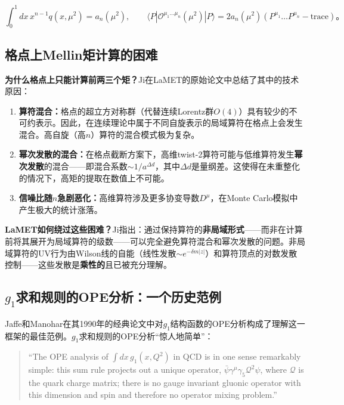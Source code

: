 \documentclass[12pt,a4paper]{ctexart}
\theoremstyle{definition}
\begin{document}
\begin{equation}
\int_0^1 dx\, x^{n-1} q(x, \mu^2) = a_n(\mu^2), \qquad \langle P|\mathcal{O}^{\mu_1\ldots\mu_n}(\mu^2)|P\rangle = 2a_n(\mu^2)(P^{\mu_1}\ldots P^{\mu_n} - \text{trace})。
\label{eq:moment_relation}
\end{equation}

\subsection{格点上Mellin矩计算的困难}

\textbf{为什么格点上只能计算前两三个矩？}Ji在LaMET的原始论文中总结了其中的技术原因\cite{Ji2013Euclidean}：

\begin{enumerate}
    \item \textbf{算符混合：}格点的超立方对称群（代替连续Lorentz群$O(4)$）具有较少的不可约表示。因此，在连续理论中属于不同自旋表示的局域算符在格点上会发生混合。高自旋（高$n$）算符的混合模式极为复杂。

    \item \textbf{幂次发散的混合：}在格点截断方案下，高维twist-2算符可能与低维算符发生\textbf{幂次发散}的混合——即混合系数$\sim 1/a^{\Delta d}$，其中$\Delta d$是量纲差。这使得在未重整化的情况下，高矩的提取在数值上不可能。

    \item \textbf{信噪比随$n$急剧恶化：}高维算符涉及更多协变导数$D^\mu$，在Monte Carlo模拟中产生极大的统计涨落。
\end{enumerate}

\textbf{LaMET如何绕过这些困难？}Ji指出\cite{Ji2013Euclidean,Ji2017More}：通过保持算符的\textbf{非局域形式}——而非在计算前将其展开为局域算符的级数——可以完全避免算符混合和幂次发散的问题。非局域算符的UV行为由Wilson线的自能（线性发散$\sim e^{-\delta m|z|}$）和算符顶点的对数发散控制——这些发散是\textbf{乘性的}且已被充分理解。

\subsection{$g_1$求和规则的OPE分析：一个历史范例}

Jaffe和Manohar在其1990年的经典论文\cite{JaffeManohar1990}中对$g_1$结构函数的OPE分析构成了理解这一框架的最佳范例。$g_1$求和规则的OPE分析``惊人地简单''\cite{JaffeManohar1990}：

\begin{quote}
``The OPE analysis of $\int dx\, g_1(x,Q^2)$ in QCD is in one sense remarkably simple: this sum rule projects out a unique operator, $\bar{\psi}\gamma^\mu\gamma_5\mathcal{Q}^2\psi$, where $\mathcal{Q}$ is the quark charge matrix; there is no gauge invariant gluonic operator with this dimension and spin and therefore no operator mixing problem.''
\end{quote}
\end{document}
